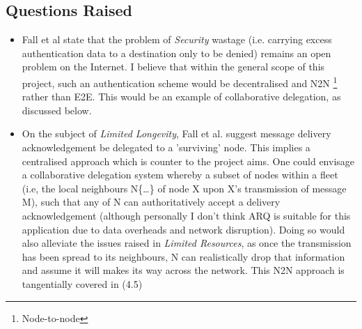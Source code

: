 \subsection{Questions Raised}
\begin{itemize}
  \item Fall et al state that the problem of \emph{Security} wastage (i.e.
  carrying excess authentication data to a destination only to be denied) remains an open
  problem on the Internet. I believe that within the general scope of this
  project, such an authentication scheme would be decentralised and
  N2N \footnote{Node-to-node} rather than E2E. This would be an example of
  collaborative delegation, as discussed below.
  \item On the subject of \emph{Limited Longevity}, Fall et al. suggest message
  delivery acknowledgement be delegated to a 'surviving' node. This implies a
  centralised approach which is counter to the project aims. One could envisage
  a collaborative delegation system whereby a subset of nodes within a fleet
  (i.e, the local neighbours N\{\ldots\} of node X upon X's transmission of
  message M), such that any of N can authoritatively accept a delivery
  acknowledgement (although personally I don't think ARQ is suitable for this
  application due to data overheads and network disruption). Doing so would also
  alleviate the issues raised in \emph{Limited Resources}, as once the
  transmission has been spread to its neighbours, N can realistically drop that
  information and assume it will makes its way across the network. This N2N
  approach is tangentially covered in (4.5)
\end{itemize}
